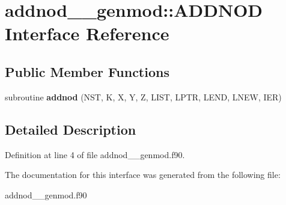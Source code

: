 \hypertarget{interfaceaddnod____genmod_1_1_a_d_d_n_o_d}{\section{addnod\+\_\+\+\_\+genmod\+:\+:A\+D\+D\+N\+O\+D Interface Reference}
\label{interfaceaddnod____genmod_1_1_a_d_d_n_o_d}
}
\subsection*{Public Member Functions}
\begin{DoxyCompactItemize}
\item 
\hypertarget{interfaceaddnod____genmod_1_1_a_d_d_n_o_d_a1175036ec5c578c08a7d2ee3a31ce1c3}{subroutine {\bfseries addnod} (N\+S\+T, K, X, Y, Z, L\+I\+S\+T, L\+P\+T\+R, L\+E\+N\+D, L\+N\+E\+W, I\+E\+R)}\label{interfaceaddnod____genmod_1_1_a_d_d_n_o_d_a1175036ec5c578c08a7d2ee3a31ce1c3}

\end{DoxyCompactItemize}


\subsection{Detailed Description}


Definition at line 4 of file addnod\+\_\+\+\_\+genmod.\+f90.



The documentation for this interface was generated from the following file\+:\begin{DoxyCompactItemize}
\item 
addnod\+\_\+\+\_\+genmod.\+f90\end{DoxyCompactItemize}
